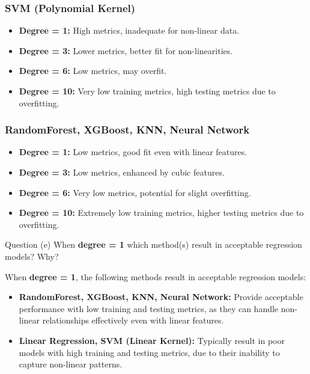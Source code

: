 \subsubsection*{SVM (Polynomial Kernel)}

\begin{itemize}
    \item \textbf{Degree = 1:} High metrics, inadequate for non-linear data.
    \item \textbf{Degree = 3:} Lower metrics, better fit for non-linearities.
    \item \textbf{Degree = 6:} Low metrics, may overfit.
    \item \textbf{Degree = 10:} Very low training metrics, high testing metrics due to overfitting.
\end{itemize}

\subsubsection*{RandomForest, XGBoost, KNN, Neural Network}

\begin{itemize}
    \item \textbf{Degree = 1:} Low metrics, good fit even with linear features.
    \item \textbf{Degree = 3:} Low metrics, enhanced by cubic features.
    \item \textbf{Degree = 6:} Very low metrics, potential for slight overfitting.
    \item \textbf{Degree = 10:} Extremely low training metrics, higher testing metrics due to overfitting.
\end{itemize}


\begin{customboxnew}[label={box:Q3e}]{Question (e)}
	When \textbf{degree = 1} which method(s) result in acceptable regression models? Why?
\end{customboxnew}

When \textbf{degree = 1}, the following methods result in acceptable regression models:

\begin{itemize}
    \item \textbf{RandomForest, XGBoost, KNN, Neural Network:} Provide acceptable performance with low training and testing metrics, as they can handle non-linear relationships effectively even with linear features.
    \item \textbf{Linear Regression, SVM (Linear Kernel):} Typically result in poor models with high training and testing metrics, due to their inability to capture non-linear patterns.
\end{itemize}

